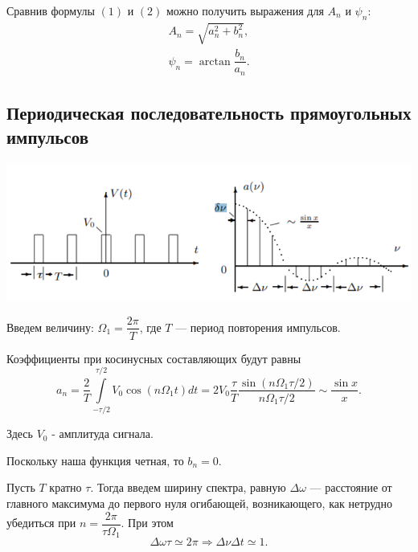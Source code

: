 \documentclass[a4paper,12pt]{article}
\begin{document}
Сравнив формулы $(1)$ и $(2)$ можно получить выражения для $A_n$  и $\psi_n$:
\begin{equation}
\begin{array}{l}
A_n = \sqrt{a_n^2+b_n^2},\\
 \psi_n = \arctan \dfrac{b_n}{a_n}.
\end{array}
\end{equation}
\subsection*{Периодическая последовательность прямоугольных импульсов}
\begin{center}
\includegraphics[scale=0.9]{2.png}
\end{center}
Введем величину: $\Omega_1 = \dfrac{2\pi}{T}$,
где $T$ --- период повторения импульсов.

Коэффициенты при косинусных составляющих будут равны
\begin{equation}
a_n = \dfrac{2}{T}\int\limits_{-\tau/2}^{\tau/2}V_0\cos\left(n\Omega_1 t\right)dt = 2V_0\dfrac{\tau}{T}\dfrac{\sin\left(n\Omega_1\tau/2\right)}{n\Omega_1\tau/2} \sim \dfrac{\sin x}{x}.
\end{equation}

Здесь $V_0$ - амплитуда сигнала.

Поскольку наша функция четная, то $b_n = 0$.

Пусть $T$ кратно $\tau$. Тогда введем ширину спектра, равную $\Delta \omega$ --- расстояние от главного максимума до первого нуля огибающей, возникающего, как нетрудно убедиться при $n = \dfrac{2\pi}{\tau \Omega_1}$. При
этом
\begin{equation}
\Delta \omega \tau \simeq 2\pi \Rightarrow \Delta \nu \Delta t \simeq 1.
\end{equation}
\end{document}
